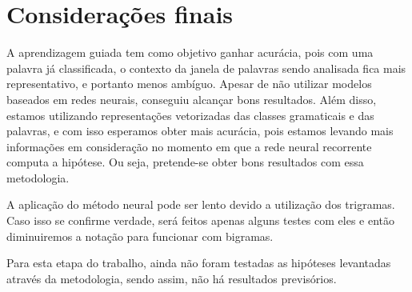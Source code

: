 \chapter{Considerações finais}\label{consideracoes}

A aprendizagem guiada tem como objetivo ganhar acurácia, pois com uma palavra já classificada, o contexto da janela de palavras sendo analisada fica mais representativo, e portanto menos ambíguo. Apesar de  não utilizar modelos baseados em redes neurais, conseguiu alcançar bons resultados. Além disso, estamos utilizando representações vetorizadas das classes gramaticais e das palavras, e com isso esperamos obter mais acurácia, pois estamos levando mais informações em consideração no momento em que a rede neural recorrente computa a hipótese. Ou seja, pretende-se obter bons resultados com essa metodologia.

A aplicação do método neural pode ser lento devido a utilização dos trigramas. Caso isso se confirme verdade, será feitos apenas alguns testes com eles e então diminuiremos a notação para funcionar com bigramas. 

Para esta etapa do trabalho, ainda não foram testadas as hipóteses levantadas através da metodologia, sendo assim, não há resultados previsórios.